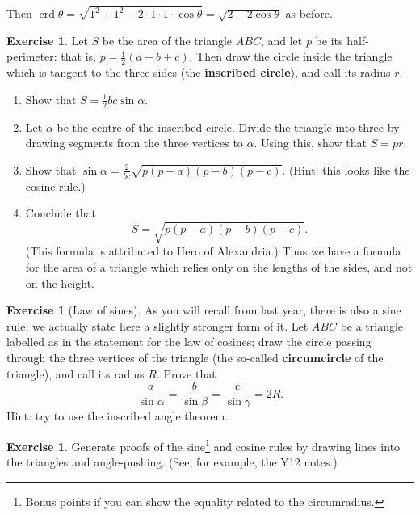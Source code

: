 \documentclass[a4paper,leqno]{article}
\newcommand{\marginsymbol}{\marginpar{\hfill(\ding{43})}}
\numberwithin{equation}{section}
\theoremstyle{definition}
\newtheorem{exercise}[equation]{Exercise}
\theoremstyle{remark}
\newcommand{\df}[1]{\textbf{#1}}
\DeclareMathOperator{\crd}{crd}
\begin{document}
Then $ \crd \theta = \sqrt{1^2 + 1^2 - 2\cdot1\cdot1\cdot \cos \theta} = \sqrt{2 - 2\cos \theta} $ as before.

\begin{exercise}
  Let $ S $ be the area of the triangle $ ABC $, and let $ p $ be its half-perimeter: that is, $ p = \frac{1}{2}(a + b + c) $. Then draw
  the circle inside the triangle which is tangent to the three sides (the \df{inscribed circle}), and call its radius $ r $.
  \begin{enumerate}
    \item Show that $ S = \frac{1}{2} bc \sin \alpha $.
    \item Let $ \alpha $ be the centre of the inscribed circle. Divide the triangle into three by drawing segments
          from the three vertices to $ \alpha $. Using this, show that $ S = pr $.
    \item Show that $ \sin \alpha = \frac{2}{bc}\sqrt{p(p-a)(p-b)(p-c)} $. (Hint: this looks like the cosine rule.)
    \item Conclude that
          \begin{displaymath}
            S = \sqrt{p(p-a)(p-b)(p-c)}.
          \end{displaymath}
          (This formula is attributed to Hero of Alexandria.) Thus we have a formula for the area of a triangle which
          relies only on the lengths of the sides, and not on the height.
  \end{enumerate}
\end{exercise}

\begin{exercise}[Law of sines]
  As \marginsymbol you will recall from last year, there is also a sine rule; we actually state here a slightly stronger
  form of it. Let $ ABC $ be a triangle labelled as in the statement for the law of cosines; draw the circle passing
  through the three vertices of the triangle (the so-called \df{circumcircle} of the triangle), and call its
  radius $ R $. Prove that
  \begin{displaymath}
    \frac{a}{\sin \alpha} = \frac{b}{\sin \beta} = \frac{c}{\sin \gamma} = 2R.
  \end{displaymath}
  Hint: try to use the inscribed angle theorem.
\end{exercise}

\begin{exercise}
  Generate proofs of the sine\footnote{Bonus points if you can show the equality related to the circumradius.} and cosine rules by drawing lines into the
  triangles and angle-pushing. (See, for example, the Y12 notes.)
\end{exercise}
\end{document}

